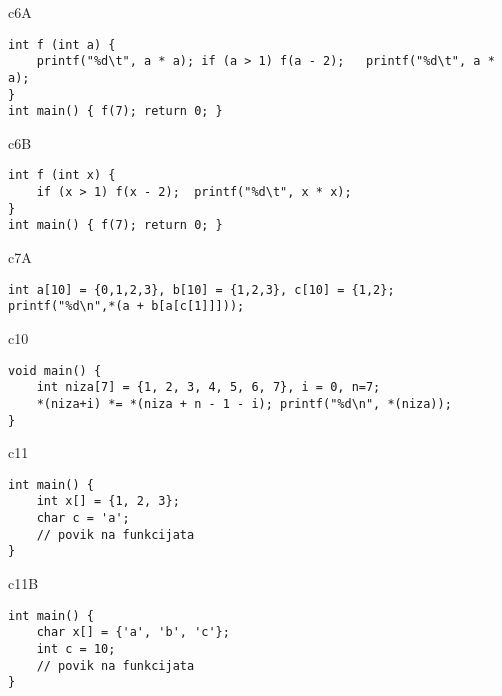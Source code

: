 \begin{chunk}{c6A}
\begin{verbatim}
int f (int a) {   
    printf("%d\t", a * a); if (a > 1) f(a - 2);   printf("%d\t", a * a);    
}
int main() { f(7); return 0; }
\end{verbatim}
\end{chunk}

\begin{chunk}{c6B}
\begin{verbatim}
int f (int x) {   
    if (x > 1) f(x - 2);  printf("%d\t", x * x);    
}
int main() { f(7); return 0; }
\end{verbatim}
\end{chunk}

\begin{chunk}{c7A}
\begin{verbatim}
int a[10] = {0,1,2,3}, b[10] = {1,2,3}, c[10] = {1,2};
printf("%d\n",*(a + b[a[c[1]]]));
\end{verbatim}
\end{chunk}

\begin{chunk}{c10}
\begin{verbatim}
void main() {   
    int niza[7] = {1, 2, 3, 4, 5, 6, 7}, i = 0, n=7;
    *(niza+i) *= *(niza + n - 1 - i); printf("%d\n", *(niza));
}
\end{verbatim}
\end{chunk}

\begin{chunk}{c11}
\begin{verbatim}
int main() {
    int x[] = {1, 2, 3};
    char c = 'a';
    // povik na funkcijata
}
\end{verbatim}
\end{chunk}

\begin{chunk}{c11B}
\begin{verbatim}
int main() {
    char x[] = {'a', 'b', 'c'};
    int c = 10;
    // povik na funkcijata
}
\end{verbatim}
\end{chunk}